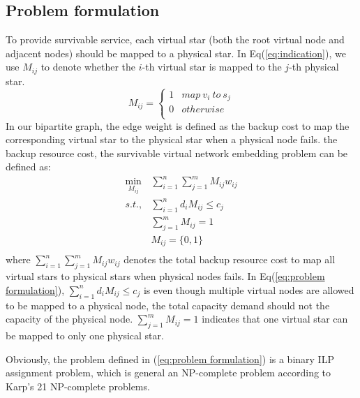 \subsection{Problem formulation}
To provide  survivable service, each virtual star (both the root virtual node and  adjacent nodes) should be mapped to a physical star. In Eq(\ref{eq:indication}), we use  $M_{ij}$ to denote whether  the $i$-th virtual star is mapped to the $j$-th physical star.
\begin{equation}
{M_{ij}} = \left\{ {\begin{array}{*{20}{c}}
   1 & {map \ v_i \  to  \ s_j}  \\
   0 & {otherwise}  \\
\end{array}} \right.
\label{eq:indication}
\end{equation}
In our bipartite graph, the edge weight is defined as the backup cost to map the corresponding virtual star to the physical star when a physical node fails.  the backup resource cost, the survivable virtual network embedding problem can be defined as:
\begin{equation}
\begin{array}{*{20}{c}}
   {\mathop {\min }\limits_{{M_{ij}}} } & {\sum\limits_{i = 1}^n {\sum\limits_{j = 1}^m {{M_{ij}}{w_{ij}}} } }  \\
   {s.t.,} & {\sum\limits_{i = 1}^n {{d_i}{M_{ij}}}  \le {c_j}}  \\
   {} & {\sum\limits_{j = 1}^m {{M_{ij}}}  = 1}  \\
   {} & {{M_{ij}} = \{ 0,1\} }  \\
\end{array}
\label{eq:problem formulation}
\end{equation}
where ${\sum\limits_{i = 1}^n {\sum\limits_{j = 1}^m {{M_{ij}}{w_{ij}}} } }$ denotes the total backup resource  cost to map all  virtual stars to physical stars when physical nodes fails.  In Eq(\ref{eq:problem formulation}), ${\sum\limits_{i = 1}^n {{d_i}{M_{ij}}}  \le {c_j}}$ is  even though multiple virtual nodes are allowed to be mapped to a physical node, the total capacity demand should not  the capacity of the physical node. ${\sum\limits_{j = 1}^m {{M_{ij}}}  = 1}$ indicates that one virtual star can be mapped to only one physical star.

Obviously, the problem defined in (\ref{eq:problem formulation}) is a binary ILP assignment problem, which is general an NP-complete problem according to Karp's 21 NP-complete problems\cite{karp1975computational}. %

